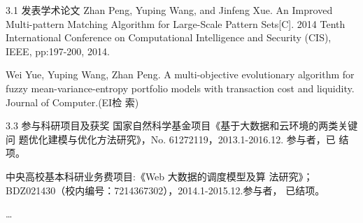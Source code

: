 \begin{resume}
\begin{resumelist}{\hspace{-0.25em}3.1\hspace{0.5em} 发表学术论文}
  \resumelistitem Zhan Peng, Yuping Wang, and Jinfeng Xue. An Improved
  Multi-pattern Matching Algorithm for Large-Scale Pattern
  Sets[C]. 2014 Tenth International Conference on Computational
  Intelligence and Security (CIS), IEEE, pp:197-200, 2014.

  \resumelistitem Wei Yue, Yuping Wang, Zhan Peng. A multi-objective
  evolutionary algorithm for fuzzy mean-variance-entropy portfolio
  models with transaction cost and liquidity. Journal of Computer.(EI检
  索)
\end{resumelist}

\begin{resumelist}{\hspace{-0.25em}3.3\hspace{0.5em} 参与科研项目及获奖}
  \resumelistitem 国家自然科学基金项目《基于大数据和云环境的两类关键问
  题优化建模与优化方法研究》，No. 61272119，2013.1-2016.12. 参与者，已
  结项。

  \resumelistitem 中央高校基本科研业务费项目:《Web 大数据的调度模型及算
  法研究》；BDZ021430（校内编号：7214367302），2014.1-2015.12.参与者，
  已结项。

\resumelistitem \ldots
\end{resumelist}
\end{resume}
